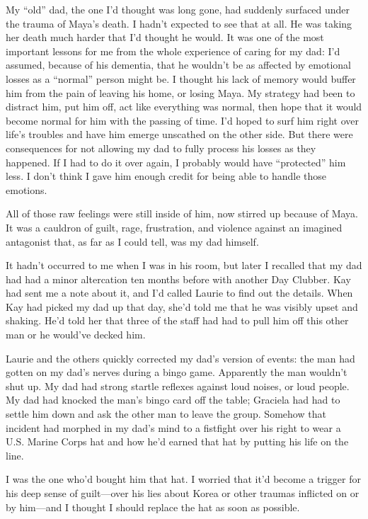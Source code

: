 \documentclass[12pt]{book}
\begin{document}
My ``old'' dad, the one I'd thought was long gone, had suddenly surfaced under the trauma of Maya's death. I hadn't expected to see that at all. He was taking her death much harder that I'd thought he would. It was one of the most important lessons for me from the whole experience of caring for my dad: I'd assumed, because of his dementia, that he wouldn't be as affected by emotional losses as a ``normal'' person might be. I thought his lack of memory would buffer him from the pain of leaving his home, or losing Maya. My strategy had been to distract him, put him off, act like everything was normal, then hope that it would become normal for him with the passing of time. I'd hoped to surf him right over life's troubles and have him emerge unscathed on the other side. But there were consequences for not allowing my dad to fully process his losses as they happened. If I had to do it over again, I probably would have ``protected'' him less. I don't think I gave him enough credit for being able to handle those emotions.

All of those raw feelings were still inside of him, now stirred up because of Maya. It was a cauldron of guilt, rage, frustration, and violence against an imagined antagonist that, as far as I could tell, was my dad himself.

It hadn't occurred to me when I was in his room, but later I recalled that my dad had had a minor altercation ten months before with another Day Clubber. Kay had sent me a note about it, and I'd called Laurie to find out the details. When Kay had picked my dad up that day, she'd told me that he was visibly upset and shaking. He'd told her that three of the staff had had to pull him off this other man or he would've decked him.

Laurie and the others quickly corrected my dad's version of events: the man had gotten on my dad's nerves during a bingo game. Apparently the man wouldn't shut up. My dad had strong startle reflexes against loud noises, or loud people. My dad had knocked the man's bingo card off the table; Graciela had had to settle him down and ask the other man to leave the group. Somehow that incident had morphed in my dad's mind to a fistfight over his right to wear a U.S. Marine Corps hat and how he'd earned that hat by putting his life on the line.

I was the one who'd bought him that hat. I worried that it'd become a trigger for his deep sense of guilt---over his lies about Korea or other traumas inflicted on or by him---and I thought I should replace the hat as soon as possible.
\end{document}
